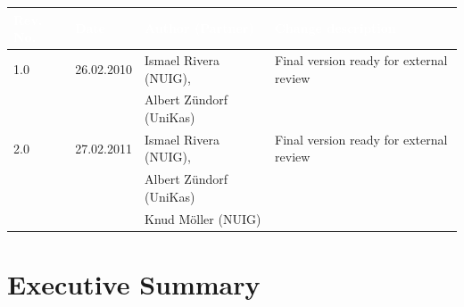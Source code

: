\documentclass{fast_latex}
\begin{document}
\begin{small}
\begin{tabular}{|l|l|l|p{7.5cm}|}
\hline
\rowcolor{fast@lightgrey}\textcolor{white}{\textbf{Rev. No.}} &
                            \textcolor{white}{\textbf{Date}} &
                            \textcolor{white}{\textbf{Author (Partner)}} &
							\textcolor{white}{\textbf{Change description}}\\ \hline
1.0 & 26.02.2010 & Ismael Rivera (NUIG), & Final version ready for external review \\ 
 & & Albert Zündorf (UniKas) & \\ \hline
2.0 & 27.02.2011 & Ismael Rivera (NUIG), & Final version ready for external review \\ 
 & & Albert Zündorf (UniKas) & \\
 & & Knud M\"oller (NUIG) & \\ \hline
\end{tabular}
\end{small}

\color{black}

\vfill

\newpage


\clearpage

\section*{Executive Summary}
\doublespacing
\end{document}
